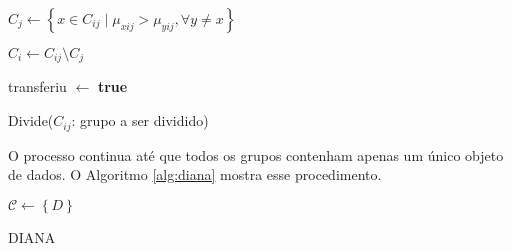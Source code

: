 \begin{function}[htbp]

	$ C_j \gets
		\left\{
			x \in C_{ij} \mid 
			\mu_{xij} > \mu_{yij},
			\forall y \neq x
		\right\}
	$ \;
	
	$C_i \gets C_{ij} \setminus C_j $ \;
	
	transferiu $\gets$ \textbf{true}\;
	
	
		
	
	\caption{Divide($C_{ij}$: grupo a ser dividido)}
	\label{func:divide}
\end{function}

O processo continua até que todos os grupos contenham apenas um único objeto 
de dados. O Algoritmo \ref{alg:diana} mostra esse procedimento.

\begin{algorithm}[htbp]
	
	$\mathcal{C} \gets \left\{ D \right\}$
	
	
	\caption{DIANA}
	\label{alg:diana}
\end{algorithm}


